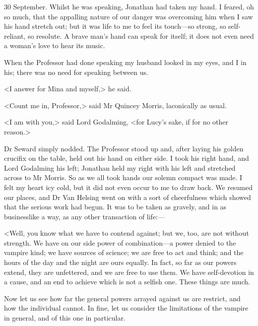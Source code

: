 \begin{diary}{30 September.}
Whilst he was speaking, Jonathan had taken my hand. I feared, oh so much, that the appalling nature of our danger was overcoming him when I saw his hand stretch out; but it was life to me to feel its touch—so strong, so self-reliant, so resolute. A brave man's hand can speak for itself; it does not even need a woman's love to hear its music.

When the Professor had done speaking my husband looked in my eyes, and I in his; there was no need for speaking between us.

<I answer for Mina and myself,> he said.

<Count me in, Professor,> said Mr Quincey Morris, laconically as usual.

<I am with you,> said Lord Godalming, <for Lucy's sake, if for no other reason.>

Dr Seward simply nodded. The Professor stood up and, after laying his golden crucifix on the table, held out his hand on either side. I took his right hand, and Lord Godalming his left; Jonathan held my right with his left and stretched across to Mr Morris. So as we all took hands our solemn compact was made. I felt my heart icy cold, but it did not even occur to me to draw back. We resumed our places, and Dr Van Helsing went on with a sort of cheerfulness which showed that the serious work had begun. It was to be taken as gravely, and in as businesslike a way, as any other transaction of life:—

<Well, you know what we have to contend against; but we, too, are not without strength. We have on our side power of combination—a power denied to the vampire kind; we have sources of science; we are free to act and think; and the hours of the day and the night are ours equally. In fact, so far as our powers extend, they are unfettered, and we are free to use them. We have self-devotion in a cause, and an end to achieve which is not a selfish one. These things are much.

Now let us see how far the general powers arrayed against us are restrict, and how the individual cannot. In fine, let us consider the limitations of the vampire in general, and of this one in particular.


\end{diary}
